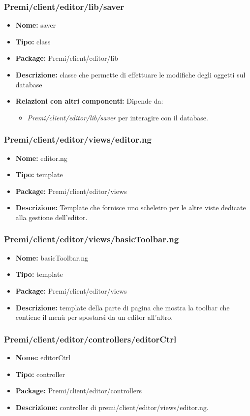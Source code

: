 \subsubsection{Premi/client/editor/lib/saver}
\begin{itemize}
  \item[] \textbf{Nome:} saver
  \item[] \textbf{Tipo:} class
  \item[] \textbf{Package:} Premi/client/editor/lib
  \item[] \textbf{Descrizione:} classe che permette di effettuare le modifiche degli oggetti sul database
  \item[] \textbf{Relazioni con altri componenti:} Dipende da:
\begin{itemize} 
	\item \textit{Premi/client/editor/lib/saver} per interagire con il database.
\end{itemize}  
\end{itemize}
\subsubsection{Premi/client/editor/views/editor.ng}
\begin{itemize}
  \item[] \textbf{Nome:} editor.ng
  \item[] \textbf{Tipo:} template
  \item[] \textbf{Package:} Premi/client/editor/views
  \item[] \textbf{Descrizione:} Template che fornisce uno scheletro per le altre viste dedicate alla gestione dell'editor.
\end{itemize}
\subsubsection{Premi/client/editor/views/basicToolbar.ng}
\begin{itemize}
  \item[] \textbf{Nome:} basicToolbar.ng
  \item[] \textbf{Tipo:} template
  \item[] \textbf{Package:} Premi/client/editor/views
  \item[] \textbf{Descrizione:} template della parte di pagina che mostra la toolbar che contiene il menù per spostarsi da un editor all'altro.
\end{itemize}
\subsubsection{Premi/client/editor/controllers/editorCtrl}
\begin{itemize}
  \item[] \textbf{Nome:} editorCtrl
  \item[] \textbf{Tipo:} controller
  \item[] \textbf{Package:} Premi/client/editor/controllers
  \item[] \textbf{Descrizione:} controller di premi/client/editor/views/editor.ng.
\end{itemize}
